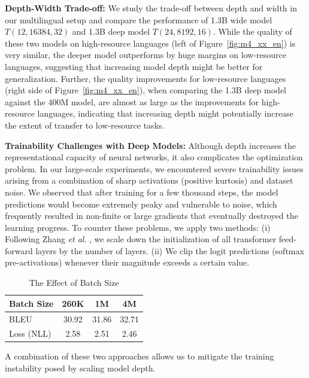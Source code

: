 \documentclass{article}
\def\onedot{.}
\def\etal{\emph{et al}\onedot}
\begin{document}
\textbf{Depth-Width Trade-off:} We study the trade-off between depth and width in our multilingual setup and compare the performance of 1.3B wide model $T(12, 16384, 32)$ and 1.3B deep model $T(24, 8192, 16)$. 
While the quality of these two models on high-resource languages (left of Figure~\ref{fig:m4_xx_en}) is very similar, the deeper model outperforms by huge margins on low-resource languages, suggesting that increasing model depth might be better for generalization. Further, the quality improvements for low-resource languages (right side of Figure~\ref{fig:m4_xx_en}), when comparing the 1.3B deep model against the 400M model, are almost as large as the improvements for high-resource languages, indicating that increasing depth might potentially increase the extent of transfer to low-resource tasks.

\textbf{Trainability Challenges with Deep Models:} Although depth increases the representational capacity of neural networks, it also complicates the optimization problem. In our large-scale experiments, we encountered severe trainability issues arising from a combination of sharp activations (positive kurtosis) and dataset noise. We observed that after training for a few thousand steps, the model predictions would become extremely peaky and vulnerable to noise, which frequently resulted in non-finite or large gradients that eventually destroyed the learning progress. To counter these problems, we apply two methods: (i) Following Zhang \etal{} \cite{zhang2019fixup}, we scale down the initialization of all transformer feed-forward layers by the number of layers. (ii) We clip the logit predictions (softmax pre-activations) whenever their magnitude exceeds a certain value. 
 \begin{table} 
\begin{center}
\caption{The Effect of Batch Size}
\label{tab:bsz}
\begin{tabular}{l|ccc}
\toprule
    Batch Size     & 260K  & 1M    & 4M    \\ \hline
    BLEU       & 30.92 & 31.86 & 32.71 \\
    Loss (NLL) & 2.58  & 2.51  & 2.46 \\    
\bottomrule    
\end{tabular}
\end{center}
\end{table}
A combination of these two approaches allows us to mitigate the training instability posed by scaling model depth.
\end{document}
